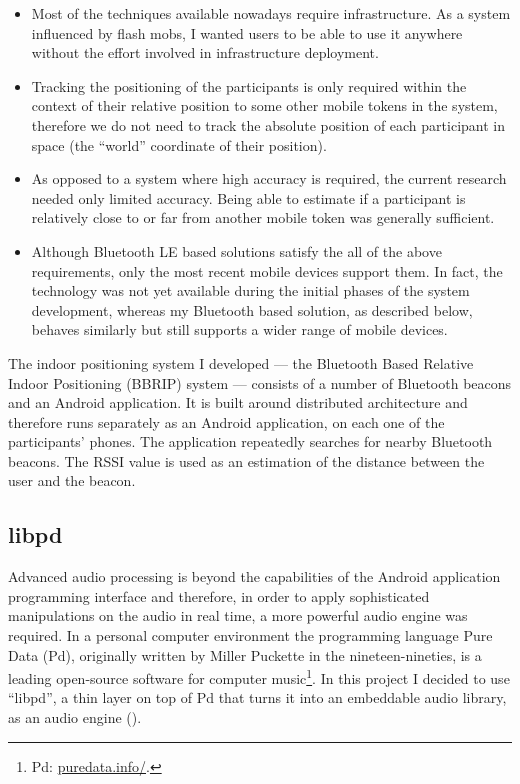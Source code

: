 \documentclass[a4paper,11pt]{article}
\begin{document}
\begin{itemize}
	\item Most of the techniques available nowadays require infrastructure.
	As a system influenced by flash mobs, I wanted users to be able to use it anywhere without the effort involved in infrastructure deployment.
	\item Tracking the positioning of the participants is only required within the context of their relative position to some other mobile tokens in the system, therefore we do not need to track the absolute position of each participant in space (the ``world'' coordinate of their position).
	\item As opposed to a system where high accuracy is required, the current research needed only limited accuracy.
	Being able to estimate if a participant is relatively close to or far from another mobile token was generally sufficient.
        \item Although Bluetooth LE based solutions satisfy the all of the above requirements, only the most recent mobile devices support them. In fact, the technology was not yet available during the initial phases of the system development, whereas my Bluetooth based solution, as described below, behaves similarly but still supports a wider range of mobile devices.
\end{itemize}

The indoor positioning system I developed --- the Bluetooth Based Relative Indoor Positioning (BBRIP) system --- consists of a number of Bluetooth beacons and an Android application.
It is built around distributed architecture and therefore runs separately as an Android application, on each one of the participants' phones.
The application repeatedly searches for nearby Bluetooth beacons.
The RSSI value is used as an estimation of the distance between the user and the beacon.

\subsection{libpd}\label{methods:libpd}

Advanced audio processing is beyond the capabilities of the Android application programming interface and therefore, in order to apply sophisticated manipulations on the audio in real time, a more powerful audio engine was required.
In a personal computer environment the programming language Pure Data (Pd), originally written by Miller Puckette in the nineteen-nineties, is a leading open-source software for computer music\footnote{Pd: \href{http://puredata.info/}{puredata.info/}.}.
In this project I decided to use ``libpd'', a thin layer on top of Pd that turns it into an embeddable audio library, as an audio engine (\cite[p. v]{brinkmann12}).
\end{document}
